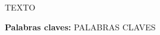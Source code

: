 \begin{addmargin}[5em]{5em}
\section*{\centering \runtitulo}

\noindent TEXTO

\bigskip

\noindent\textbf{Palabras claves:} PALABRAS CLAVES
\end{addmargin}
